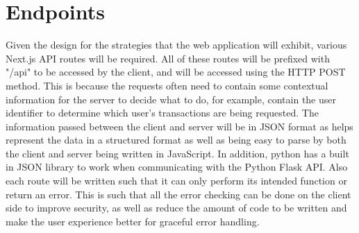 \section{Endpoints}
Given the design for the strategies that the web application will exhibit, various Next.js API routes will be required. All of these routes will be prefixed with "/api" to be accessed by the client, and will be accessed using the HTTP POST method. This is because the requests often need to contain some contextual information for the server to decide what to do, for example, contain the user identifier to determine which user's transactions are being requested. The information passed between the client and server will be in JSON format as helps represent the data in a structured format as well as being easy to parse by both the client and server being written in JavaScript. In addition, python has a built in JSON library to work when communicating with the Python Flask API. Also each route will be written such that it can only perform its intended function or return an error. This is such that all the error checking can be done on the client side to improve security, as well as reduce the amount of code to be written and make the user experience better for graceful error handling.





